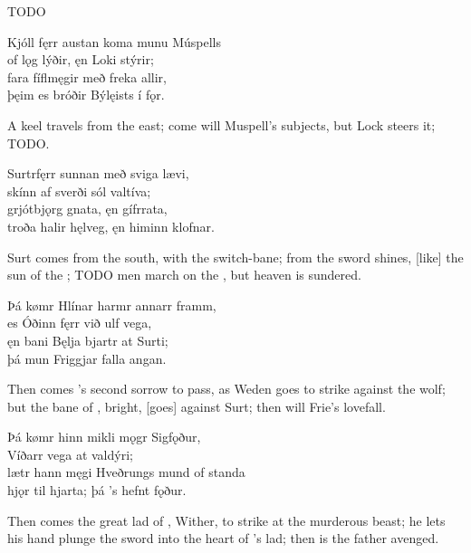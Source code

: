 \bvb TODO\evb

\bva Kjóll fęrr austan \hld koma munu Múspells \\%
of lǫg lýðir, \hld ęn Loki stýrir; \\%
fara fíflmęgir \hld með freka allir, \\%
þęim es bróðir \hld Býlęists í fǫr.\eva

\bvb A keel travels from the east; come will Muspell’s subjects, but Lock steers it; TODO.\evb

\bva Surtr\footnotemark[1] fęrr sunnan \hld með sviga lævi, \\%
skínn af sverði \hld sól valtíva; \\%
grjótbjǫrg gnata, \hld ęn gífr\footnotemark[2] rata, \\%
troða halir hęlveg, \hld ęn himinn klofnar.\eva
{}

\bvb Surt comes from the south, with the switch-bane\footnotemark[1]; from the sword shines, [like] the sun of the ; TODO men march on the , but heaven is sundered.\footnotemark[2]\evb
{}

\bva Þá kømr Hlínar \hld harmr annarr framm, \\%
es Óðinn fęrr \hld við ulf vega, \\%
ęn bani Bęlja \hld bjartr at Surti; \\%
þá mun Friggjar \hld falla angan.\eva

\bvb Then comes ’s second sorrow to pass, as Weden goes to strike against the wolf; but the bane of \footnotemark[1], bright, [goes] against Surt; then will Frie’s love\footnotemark[2] fall.\evb
{}

\bva Þá kømr hinn mikli \hld mǫgr Sigfǫður, \\%
Víðarr vega \hld at valdýri; \\%
lætr hann męgi Hveðrungs \hld mund of standa \\%
hjǫr til hjarta; \hld þá ’s hefnt fǫður.\eva

\bvb Then comes the great lad of , Wither, to strike at the murderous beast; he lets his hand plunge the sword into the heart of ’s lad\footnotemark[1]; then is the father avenged.\evb
{}

